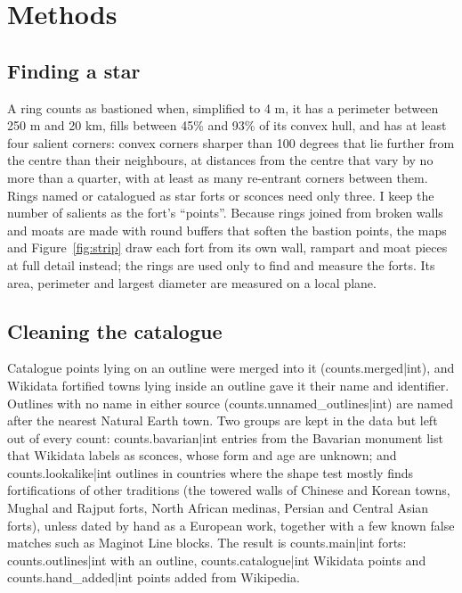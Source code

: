 \documentclass[11pt,a4paper]{article}
\begin{document}
\section{Methods}\label{sec:methods}
\subsection{Finding a star}
A ring counts as bastioned when, simplified to 4 m, it has a perimeter between 250 m and 20 km, fills between 45\% and 93\% of its convex hull, and has at least four salient corners: convex corners sharper than 100 degrees that lie further from the centre than their neighbours, at distances from the centre that vary by no more than a quarter, with at least as many re-entrant corners between them. Rings named or catalogued as star forts or sconces need only three. I keep the number of salients as the fort's ``points''. Because rings joined from broken walls and moats are made with round buffers that soften the bastion points, the maps and Figure~\ref{fig:strip} draw each fort from its own wall, rampart and moat pieces at full detail instead; the rings are used only to find and measure the forts. Its area, perimeter and largest diameter are measured on a local plane.

\subsection{Cleaning the catalogue}
Catalogue points lying on an outline were merged into it ({{counts.merged|int}}), and Wikidata fortified towns lying inside an outline gave it their name and identifier. Outlines with no name in either source ({{counts.unnamed_outlines|int}}) are named after the nearest Natural Earth town. Two groups are kept in the data but left out of every count: {{counts.bavarian|int}} entries from the Bavarian monument list that Wikidata labels as sconces, whose form and age are unknown; and {{counts.lookalike|int}} outlines in countries where the shape test mostly finds fortifications of other traditions (the towered walls of Chinese and Korean towns, Mughal and Rajput forts, North African medinas, Persian and Central Asian forts), unless dated by hand as a European work, together with a few known false matches such as Maginot Line blocks. The result is {{counts.main|int}} forts: {{counts.outlines|int}} with an outline, {{counts.catalogue|int}} Wikidata points and {{counts.hand_added|int}} points added from Wikipedia.
\end{document}
